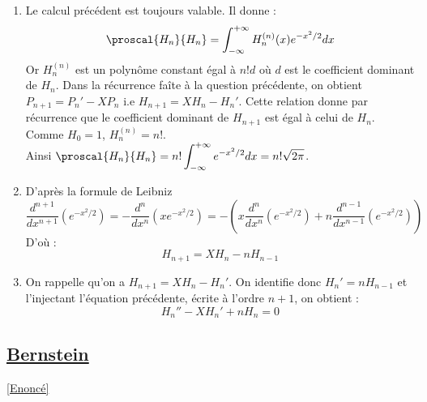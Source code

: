 \documentclass{book}
\begin{document}
\begin{enumerate}[leftmargin=*]
		Les termes de la somme sont tous nul car on a vu que $P(x)e^{-x^2/2}\underset{|x|\to+\infty}\longrightarrow 0$ pour tout $P\in \R[X]$.\\
		Le terme intégral est nul car $H_m^{(n)}=0$ (dérivée $n>m$-ième d'un polynôme de degré $m$).\\
		Ainsi $\proscal{H_n}{H_m}=0$.
		\item Le calcul précédent est toujours valable. Il donne :\\
		$$\proscal{H_n}{H_n}=\int_{-\infty}^{+\infty}H_n^{(n)}(x)e^{-x^2/2}dx$$
		Or $H_n^{(n)}$ est un polynôme constant égal à $n!d$ où $d$ est le coefficient dominant de $H_n$. Dans la récurrence faîte à la question précédente, on obtient $P_{n+1}=P_n'-XP_n$ i.e $H_{n+1}=XH_n-H_n'$. Cette relation donne par récurrence que le coefficient dominant de $H_{n+1}$ est égal à celui de $H_n$. Comme $H_0=1$, $H_n^{(n)}=n!$.\\
		Ainsi $\proscal{H_n}{H_n}=n!\displaystyle\int_{-\infty}^{+\infty}e^{-x^2/2}dx=n!\sqrt{2\pi}$.
		\item D'après la formule de Leibniz
		$$\frac{d^{n+1}}{dx^{n+1}}\left(e^{-x^2/2}\right)=-\frac{d^n}{dx^n}\left(xe^{-x^2/2}\right)=-\left(x\frac{d^n}{dx^n}\left(e^{-x^2/2}\right)+n\frac{d^{n-1}}{dx^{n-1}}\left(e^{-x^2/2}\right)\right)$$
		D'où :
		$$H_{n+1}=XH_n-nH_{n-1}$$
		\item On rappelle qu'on a $H_{n+1}=XH_n-H_n'$. On identifie donc $H_n'=nH_{n-1}$ et l'injectant l'équation précédente, écrite à l'ordre $n+1$, on obtient :
		$$H_n''-XH_n'+nH_n=0$$
	\end{enumerate}
	
	\subsection{\underline{Bernstein} }
	\label{sec:Bernstein}
	\textcolor{blue}{\hyperref[Bernstein]{[Enoncé]}}\\
	
\end{document}
